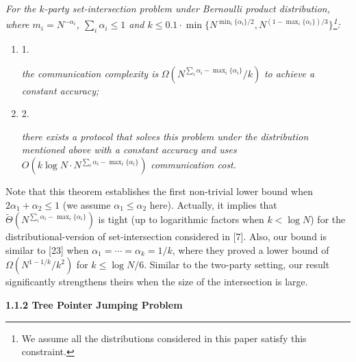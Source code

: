 \documentclass[10pt,a4paper]{article}
\begin{document}
\emph{For the $k$-party set-intersection problem under Bernoulli product distribution, where $m_{i}=N^{-\alpha_{i}}$, $\sum_{i}\alpha_{i}\leq 1$ and $k\leq 0.1\cdot\min\{N^{\min_{i}\{\alpha_{i}\}/2},N^{(1-\max_{i}\{\alpha_{i}\})/3}\}$\footnote{We assume all the distributions considered in this paper satisfy this constraint.}:}\par


\begin{enumerate}


\item[] 
1. 


\emph{the communication complexity is }$\Omega\left(N^{\sum_{i}\alpha_{i}-\mathop{\max}_{i}\{\alpha_{i}\}}/k\right)$\emph{ to achieve a constant accuracy;}\par





\item[] 
2. 


\emph{there exists a protocol that solves this problem under the distribution mentioned above with a constant accuracy and uses }$O\left(k\log N\cdot N^{\sum_{i}\alpha_{i}-\mathop{\max}_{i}\{\alpha_{i}\}}\right)$\emph{ communication cost.}\par





\end{enumerate}






Note that this theorem establishes the first non-trivial lower bound when $2\alpha_{1}+\alpha_{2}\leq 1$ (we assume $\alpha_{1}\leq\alpha_{2}$ here). Actually, it implies that $\widetilde{\Theta}\left(N^{\sum_{i}\alpha_{i}-\mathop{\max}_{i}\{\alpha_{i}\}}\right)$ is tight (up to logarithmic factors when $k<\log N$) for the distributional-version of set-intersection considered in [7]. Also, our bound is similar to [23] when $\alpha_{1}=\cdots=\alpha_{k}=1/k$, where they proved a lower bound of $\Omega(N^{1-1/k}/k^{2})$ for $k\leq\log N/6.$ Similar to the two-party setting, our result significantly strengthens theirs when the size of the intersection is large.\par





\par\medskip\noindent\textbf{
1.1.2 Tree Pointer Jumping Problem}\par
\end{document}
